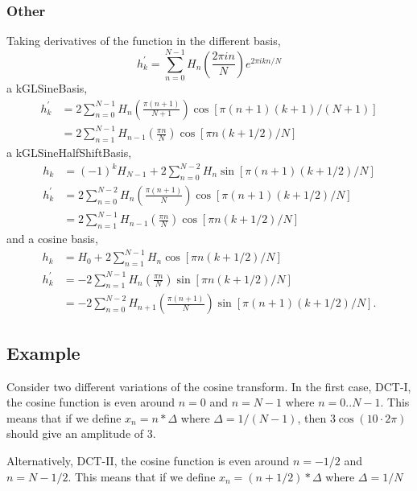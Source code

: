 \documentclass[11pt]{article}
\begin{document}
\subsubsection{Other}
Taking derivatives of the function in the different basis,
\begin{equation}
h_k^\prime = \sum_{n=0}^{N-1} H_n \left( \frac{2 \pi i n}{N} \right) e^{2\pi i k n/N}
\end{equation}
a kGLSineBasis,
\begin{align}
h_k^\prime  &= 2 \sum_{n=0}^{N-1} H_n \left( \frac{\pi (n+1)}{N+1} \right) \cos \left[ \pi(n+1)(k+1)/(N+1)\right] \\
&= 2 \sum_{n=1}^{N-1} H_{n-1} \left( \frac{\pi n}{N} \right) \cos \left[ \pi n (k+1/2)/N\right]
\end{align}
a kGLSineHalfShiftBasis,
\begin{align}
h_k &= (-1)^k H_{N-1} + 2 \sum_{n=0}^{N-2} H_n \sin \left[ \pi(n+1)(k+1/2)/N\right] \\
h_k^\prime &=2 \sum_{n=0}^{N-2} H_n  \left( \frac{\pi (n+1)}{N} \right) \cos \left[ \pi(n+1)(k+1/2)/N\right] \\
&=2 \sum_{n=1}^{N-1} H_{n-1}  \left( \frac{\pi n}{N} \right) \cos \left[ \pi n(k+1/2)/N\right]
\end{align}
and a cosine basis,
\begin{align}
h_k &= H_{0} + 2 \sum_{n=1}^{N-1} H_n \cos \left[ \pi n(k+1/2)/N\right] \\
h_k^\prime &= - 2 \sum_{n=1}^{N-1} H_n  \left( \frac{\pi n}{N} \right) \sin \left[ \pi n(k+1/2)/N\right] \\
&= - 2 \sum_{n=0}^{N-2} H_{n+1}  \left( \frac{\pi (n+1)}{N} \right) \sin \left[ \pi (n+1)(k+1/2)/N\right].
\end{align}



\subsection{Example}

Consider two different variations of the cosine transform. In the first case, DCT-I, the cosine function is even around $n=0$ and $n=N-1$ where $n=0..N-1$. This means that if we define $x_n = n*\Delta$ where $\Delta = 1/(N-1)$, then $3\cos( 10 \cdot 2\pi)$ should give an amplitude of 3.

Alternatively, DCT-II, the cosine function is even around $n=-1/2$ and $n=N-1/2$. This means that if we define $x_n = (n+1/2)*\Delta$ where $\Delta = 1/N$
\end{document}
